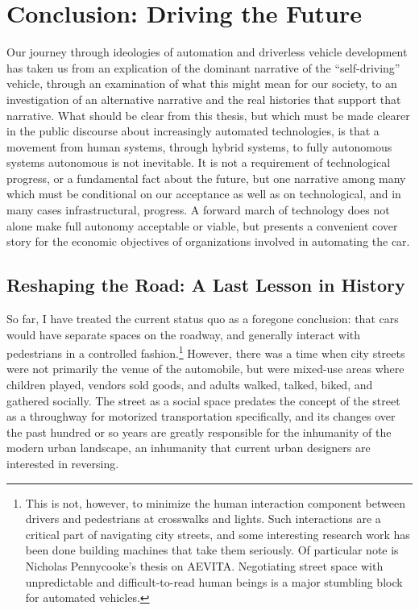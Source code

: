 \chapter{Conclusion: Driving the Future}
\label{chap:4}


Our journey through ideologies of automation and driverless vehicle
development has taken us from an explication of the dominant narrative
of the ``self-driving'' vehicle, through an examination of what this
might mean for our society, to an investigation of an alternative
narrative and the real histories that support that narrative. What
should be clear from this thesis, but which must be made clearer in the
public discourse about increasingly automated technologies, is that a
movement from human systems, through hybrid systems, to fully
autonomous systems autonomous is not inevitable. It is not a
requirement of technological progress, or a fundamental fact about the
future, but one narrative among many which must be conditional on our
acceptance as well as on technological, and in many cases
infrastructural, progress. A forward march of
technology does not alone make full autonomy acceptable or viable,
but presents a convenient cover story for the economic objectives of
organizations involved in automating the car.

\section{Reshaping the Road: A Last Lesson in History}

So far, I have treated the current status
quo as a foregone conclusion: that cars would have separate spaces on
the roadway, and generally interact with pedestrians in a controlled
fashion.\footnote{This is not, however, to minimize the human
  interaction component between drivers and pedestrians at crosswalks
  and lights. Such interactions are a critical part of navigating city
  streets, and some interesting research work has been done building
  machines that take them seriously. Of particular note is Nicholas
  Pennycooke's thesis on AEVITA\cite{???-aevita}. Negotiating street
  space with unpredictable and difficult-to-read human beings is a
  major stumbling block for automated vehicles.} However, there was a
time when city streets were not primarily the venue of the automobile,
but were mixed-use areas where children played, vendors sold goods,
and adults walked, talked, biked, and gathered socially. The street as
a social space predates the concept of the street as a throughway for
motorized transportation specifically, and its changes over the past
hundred or so years are greatly responsible for the inhumanity of the
modern urban landscape, an inhumanity that current urban designers are
interested in reversing. 

